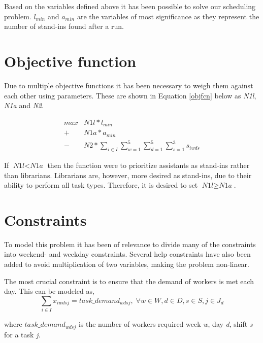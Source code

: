 
Based on the variables defined above it has been possible to solve our scheduling problem. \textit{$l_{min}$} and \textit{$a_{min}$} are the variables of most significance as they represent the number of stand-ins found after a run. 

\section{Objective function}
Due to multiple objective functions it has been necessary to weigh them against each other using parameters. These are shown in Equation \ref{objfcn} below as \textit{N1l}, \textit{N1a} and \textit{N2}.

\begin{equation} \label{objfcn}
\begin{split}
max &N1l*l_{min}\\
 + &N1a*a_{min} \\
 - &N2*\sum_{i \in I}\sum_{w = 1}^{5}\sum_{d = 1}^{5}\sum_{s = 1}^{3} s_{iwds}
\end{split}
\end{equation}

If $\textit{N1l} < \textit{N1a}$ then the function were to prioritize assistants as stand-ins rather than librarians. Librarians are, however, more desired as stand-ins, due to their ability to perform all task types. Therefore, it is desired to set $\textit{N1l} \geq \textit{N1a}$.

\section{Constraints} \label{constraints}
To model this problem it has been of relevance to divide many of the constraints into weekend- and weekday constraints. Several help constraints have also been added to avoid multiplication of two variables, making the problem non-linear.

The most crucial constraint is to ensure that the demand of workers is met each day. This can be modeled as,
\begin{equation}
\sum_{i \in I} x_{iwdsj} = task\_demand_{wdsj}, \; \forall w\in W,d\in D,s\in S,j\in J_d
\end{equation}

where $task\_demand_{wdsj}$ is the number of workers required week \textit{w}, day \textit{d}, shift \textit{s} for a task \textit{j}.


